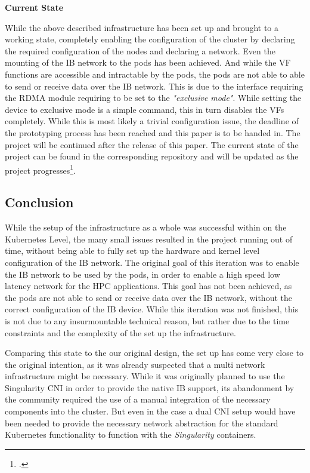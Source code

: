 \textbf{Current State}

While the above described infrastructure has been set up and brought to a working state,
completely enabling the configuration of the cluster by declaring the required configuration of the
nodes and declaring a network. Even the mounting of the \ac{IB} network to the pods has been achieved.
And while the \ac{VF} functions are accessible and intractable by the pods, the pods are not able to
able to send or receive data over the \ac{IB} network.
This is due to the interface requiring the \ac{RDMA} module requiring to be set to the \textit{"exclusive mode"}.
While setting the device to exclusive mode is a simple command, this in turn disables the \ac{VF}s completely.
While this is most likely a trivial configuration issue, the deadline of the prototyping process has been reached
and this paper is to be handed in. The project will be continued after the release of this paper.
The current state of the project can be found in the corresponding repository and will be updated as
the project progresses\footcite{joneckerthBachelorsThesisProjectMain}.

\subsection{Conclusion}

While the setup of the infrastructure as a whole was successful within on the Kubernetes Level,
the many small issues resulted in the project running out of time, without being able to
fully set up the hardware and kernel level configuration of the \ac{IB} network.
The original goal of this iteration was to enable the \ac{IB} network to be used by the pods,
in order to enable a high speed low latency network for the \ac{HPC} applications.
This goal has not been achieved, as the pods are not able to send or receive data over the \ac{IB} network,
without the correct configuration of the \ac{IB} device.
While this iteration was not finished, this is not due to any insurmountable technical reason,
but rather due to the time constraints and the complexity of the set up the infrastructure.

Comparing this state to the our original design,
the set up has come very close to the original intention,
as it was already suspected that a multi network infrastructure might be necessary.
While it was originally planned to use the Singularity \ac{CNI} in order to provide the
native \ac{IB} support, its abandonment by the community required the
use of a manual integration of the necessary components into the cluster.
But even in the case a dual \ac{CNI} setup would have been needed to provide the
necessary network abstraction for the standard Kubernetes functionality
to function with the \textit{Singularity} containers.

